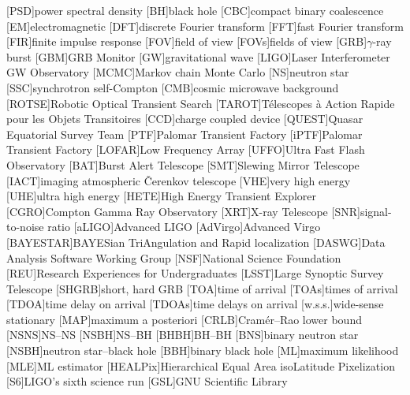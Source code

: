 \usepackage{acronym}

[PSD]{power spectral density}
[BH]{black hole}
[CBC]{compact binary coalescence}
[EM]{electromagnetic}
[DFT]{discrete Fourier transform}
[FFT]{fast Fourier transform}
[FIR]{finite impulse response}
[FOV]{field of view}
[FOVs]{fields of view}
[GRB]{$\gamma$\nobreakdashes-ray burst}
[GBM]{\acl{GRB} Monitor}
[GW]{gravitational wave}
[LIGO]{Laser Interferometer \acs{GW} Observatory}
[MCMC]{Markov chain Monte Carlo}
[NS]{neutron star}
[SSC]{synchrotron self\nobreakdashes-Compton}
[CMB]{cosmic microwave background}
[ROTSE]{Robotic Optical Transient Search}
[TAROT]{T\'{e}lescopes \`{a} Action Rapide pour les Objets Transitoires}
[CCD]{charge coupled device}
[QUEST]{Quasar Equatorial Survey Team}
[PTF]{Palomar Transient Factory}
[iPTF]{Palomar Transient Factory}
[LOFAR]{Low Frequency Array}
[UFFO]{Ultra Fast Flash Observatory}
[BAT]{Burst Alert Telescope}
[SMT]{Slewing Mirror Telescope}
[IACT]{imaging atmospheric \v{C}erenkov telescope}
[VHE]{very high energy}
[UHE]{ultra high energy}
[HETE]{High Energy Transient Explorer}
[CGRO]{Compton Gamma Ray Observatory}
[XRT]{X\nobreakdashes-ray Telescope}
[SNR]{signal\nobreakdashes-to\nobreakdashes-noise ratio}
[aLIGO]{Advanced \acs{LIGO}}
[AdVirgo]{Advanced Virgo}
[BAYESTAR]{BAYESian TriAngulation and Rapid localization}
[DASWG]{Data Analysis Software Working Group}
[NSF]{National Science Foundation}
[REU]{Research Experiences for Undergraduates}
[LSST]{Large Synoptic Survey Telescope}
[SHGRB]{short, hard \acl{GRB}}
[TOA]{time of arrival}
[TOAs]{times of arrival}
[TDOA]{time delay on arrival}
[TDOAs]{time delays on arrival}
[w.s.s.]{wide\nobreakdashes-sense stationary}
[MAP]{maximum a posteriori}
[CRLB]{Cram\'{e}r\nobreakdashes--Rao lower bound}
[NSNS]{\acl{NS}\nobreakdashes--\acl{NS}}
[NSBH]{\acl{NS}\nobreakdashes--\acl{BH}}
[BHBH]{\acl{BH}\nobreakdashes--\acl{BH}}
[BNS]{binary neutron star}
[NSBH]{neutron star\nobreakdashes--black hole}
[BBH]{binary black hole}
[ML]{maximum likelihood}
[MLE]{\ac{ML} estimator}
[HEALPix]{Hierarchical Equal Area isoLatitude Pixelization}
[S6]{\ac{LIGO}'s sixth science run}
[GSL]{GNU Scientific Library}
